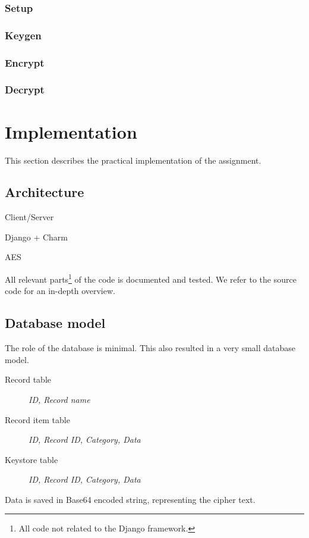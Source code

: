 \documentclass[a4paper]{article}
\begin{document}
		\subsubsection{Setup}
	
		\subsubsection{Keygen}
		
		\subsubsection{Encrypt}
		
		\subsubsection{Decrypt}
    
\section{Implementation}
	This section describes the practical implementation of the assignment.
	
	\subsection{Architecture}
		Client/Server
	
		Django + Charm
		
		AES
		
		All relevant parts\footnote{All code not related to the Django framework.} of the code is documented and tested. We refer to the source code for an in-depth overview.
	
	\subsection{Database model}
		The role of the database is minimal. This also resulted in a very small database model.
		
		\begin{description}
			\item[Record table]
			\textit{ID, Record name} 
			\item[Record item table]
			\textit{ID, Record ID, Category, Data} 			
			\item[Keystore table]
			\textit{ID, Record ID, Category, Data}
		\end{description}
	
		Data is saved in Base64 encoded string, representing the cipher text.
	
\end{document}
